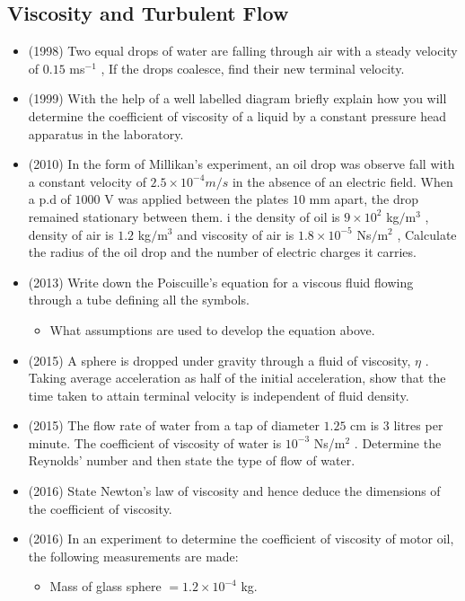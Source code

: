 \documentclass{article}
\begin{document}
\subsection{Viscosity and Turbulent Flow}
\begin{itemize}
\item (1998)  Two equal drops of water are falling through air with a steady velocity of $ 0.15$ ms$ ^{-1}$ , If the drops coalesce, find their new terminal velocity.
\item (1999)  With the help of a well labelled diagram briefly explain how you will determine the coefficient of viscosity of a liquid by a constant pressure head apparatus in the laboratory.
\item (2010)  In the form of Millikan’s experiment, an oil drop was observe fall with a constant velocity of $ 2.5	\times 10^{-4}m/s$ in the absence of an electric field. When a p.d of $ 1000$ V was applied between the plates $ 10$ mm apart, the drop remained stationary between them. i the density of oil is $ 9 \times 10^{2}$ kg$/$m$ ^{3}$ , density of air is $ 1.2$ kg$/$m$ ^{3}$ and viscosity of air is $ 1.8\times 10^{-5}$ Ns$/$m$ ^{2}$ , Calculate the radius of the oil drop and the number of electric charges it carries.
\item (2013)  Write down the Poiscuille’s equation for a viscous fluid flowing through a tube defining all the symbols.\begin{itemize}
\item What assumptions are used to develop the equation above. 
\end{itemize}
\item (2015)  A sphere is dropped under gravity through a fluid of viscosity, $ \eta $ .  Taking average acceleration as half of the initial acceleration, show that the time taken to attain terminal velocity is independent of fluid density.
\item (2015)  The flow rate of water from a tap of diameter $ 1.25$ cm is $ 3$ litres per minute.  The coefficient of viscosity of water is $ 10^{-3}$ Ns/m$ ^{2}$ .  Determine the Reynolds’ number and then state the type of flow of water.
\item (2016)  State Newton’s law of viscosity and hence deduce the dimensions of the coefficient of viscosity.
\item (2016)  In an experiment to determine the coefficient of viscosity of motor oil, the following measurements are made:\begin{itemize}
\item Mass of glass sphere $ =1.2 \times 10^{-4}$ kg.

\end{itemize}
\end{itemize}
\end{document}
